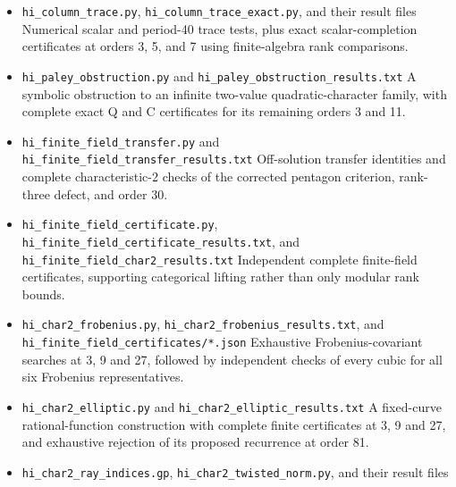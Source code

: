 \documentclass[11pt,reqno]{amsart}
\theoremstyle{plain}
\begin{document}
\begin{itemize}
Convex construction with a uniform existence and algebraicity proof for one complete quadratic column; further Izumi checks are numerical.
\item \texttt{hi\_\allowbreak column\_\allowbreak trace.py}, \texttt{hi\_\allowbreak column\_\allowbreak trace\_\allowbreak exact.py}, and their result files
Numerical scalar and period-40 trace tests, plus exact scalar-completion certificates at orders 3, 5, and 7 using finite-algebra rank comparisons.
\item \texttt{hi\_\allowbreak paley\_\allowbreak obstruction.py} and \texttt{hi\_\allowbreak paley\_\allowbreak obstruction\_\allowbreak results.txt}
A symbolic obstruction to an infinite two-value quadratic-character family,
with complete exact Q and C certificates for its remaining orders 3 and 11.
\item \texttt{hi\_\allowbreak finite\_\allowbreak field\_\allowbreak transfer.py} and \texttt{hi\_\allowbreak finite\_\allowbreak field\_\allowbreak transfer\_\allowbreak results.txt}
Off-solution transfer identities and complete characteristic-2 checks
of the corrected pentagon criterion, rank-three defect, and order 30.
\item \texttt{hi\_\allowbreak finite\_\allowbreak field\_\allowbreak certificate.py}, \texttt{hi\_\allowbreak finite\_\allowbreak field\_\allowbreak certificate\_\allowbreak results.txt},
and \texttt{hi\_\allowbreak finite\_\allowbreak field\_\allowbreak char2\_\allowbreak results.txt}
Independent complete finite-field certificates, supporting categorical
lifting rather than only modular rank bounds.
\item \texttt{hi\_\allowbreak char2\_\allowbreak frobenius.py}, \texttt{hi\_\allowbreak char2\_\allowbreak frobenius\_\allowbreak results.txt},
and \texttt{hi\_\allowbreak finite\_\allowbreak field\_\allowbreak certificates/*.json}
Exhaustive Frobenius-covariant searches at 3, 9 and 27, followed by
independent checks of every cubic for all six Frobenius representatives.
\item \texttt{hi\_\allowbreak char2\_\allowbreak elliptic.py} and \texttt{hi\_\allowbreak char2\_\allowbreak elliptic\_\allowbreak results.txt}
A fixed-curve rational-function construction with complete finite
certificates at 3, 9 and 27, and exhaustive rejection of its proposed
recurrence at order 81.
\item \texttt{hi\_\allowbreak char2\_\allowbreak ray\_\allowbreak indices.gp}, \texttt{hi\_\allowbreak char2\_\allowbreak twisted\_\allowbreak norm.py}, and their result files

\end{itemize}
\end{document}
